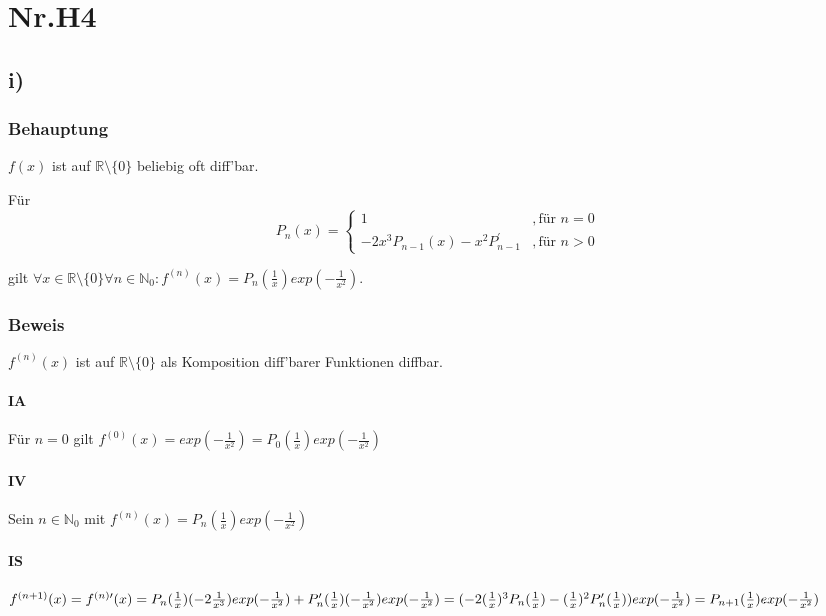 \section*{Nr.H4}

\subsection*{i)}

\subsubsection*{Behauptung}

$f(x)$ ist auf $\mathbb{R} \setminus \{0\}$ beliebig oft diff'bar.
	
Für
	\[ P_{n}(x) = 
		\begin{cases} 
			1                                         &, \text{für } n = 0 \\
			-2x^{3}P_{n-1}(x)-x^{2}P^{\prime}_{n-1}   &, \text{für } n > 0 
		\end{cases} 
	\]
	
gilt $\forall x \in \mathbb{R} \setminus \{0\} \forall n \in \mathbb{N}_{0} : 
	f^{(n)}(x)= P_{n}(\frac{1}{x})exp(- \frac{1}{x^{2}})$.

\subsubsection*{Beweis}

$f^{(n)}(x)$ ist auf $\mathbb{R} \setminus \{0\}$ als Komposition diff'barer Funktionen diffbar.

\paragraph*{IA}
	
Für $n = 0$ gilt $f^{(0)}(x) = exp(- \frac{1}{x^{2}}) = P_{0}(\frac{1}{x})exp(- \frac{1}{x^{2}})$

\paragraph*{IV}

Sein $n \in \mathbb{N}_{0}$ mit $f^{(n)}(x)= P_{n}(\frac{1}{x})exp(- \frac{1}{x^{2}})$

\paragraph*{IS}

$f^{(n+1)}(x) = f^{(n)\prime}(x)\\
	= P_{n}(\frac{1}{x})(-2\frac{1}{x^{3}})exp(- \frac{1}{x^{2}}) 
		+ P^{\prime}_{n}(\frac{1}{x})(-\frac{1}{x^{2}})exp(- \frac{1}{x^{2}}) \\
	= (-2(\frac{1}{x})^{3}P_{n}(\frac{1}{x})
		 -(\frac{1}{x})^{2}P^{\prime}_{n}(\frac{1}{x}))exp(- \frac{1}{x^{2}}) \\
	= P_{n+1}(\frac{1}{x})exp(- \frac{1}{x^{2}})$ 




	
